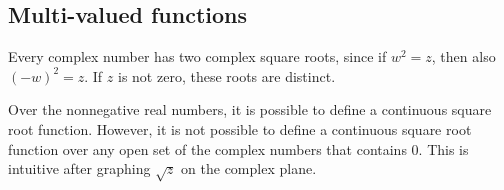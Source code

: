 \subsection*{Multi-valued functions}
Every complex number has two complex square roots, since if $w^2=z$, then also $(-w)^2=z$.
If $z$ is not zero, these roots are distinct.

Over the nonnegative real numbers, it is possible to define a continuous square root function.
However, it is not possible to define a continuous square root function over any open set of the complex numbers that contains 0.
This is intuitive after graphing $\sqrt{z}$ on the complex plane.

